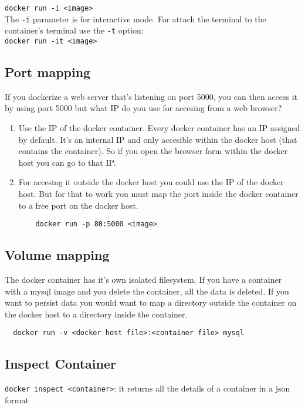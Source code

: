 \documentclass[french]{article}
\begin{document}
\verb|docker run -i <image>|\\
The \verb|-i| parameter is for interactive mode. For attach the terminal to the container's terminal use the \verb|-t| option:\\

\verb|docker run -it <image>|\\

\subsection{Port mapping}

If you dockerize a web server that's listening on port 5000, you can then access it by using port 5000 but what IP do you use for accesing from a web browser?
\begin{enumerate}
  \item Use the IP of the docker container. Every docker container has an IP assigned by default. It's an internal IP and only accesible within the docker host (that contains the container). So if you open the browser form within the docker host you can go to that IP.
  \item For accesing it outside the docker host you could use the IP of the docker host. But for that to work you must map the port inside the docker container to a free port on the docker host.
  \begin{verbatim}
    docker run -p 80:5000 <image>
  \end{verbatim}
\end{enumerate}

\subsection{Volume mapping}

The docker container has it's own isolated filesystem. If you have a container with a mysql image and you delete the container, all the data is deleted. If you want to persist data you would want to map a directory outside the container on the docker host to a directory inside the container.
\begin{verbatim}
  docker run -v <docker host file>:<container file> mysql
\end{verbatim}

\subsection{Inspect Container}

\verb|docker inspect <container>|: it returns all the details of a container in a json format
\end{document}

